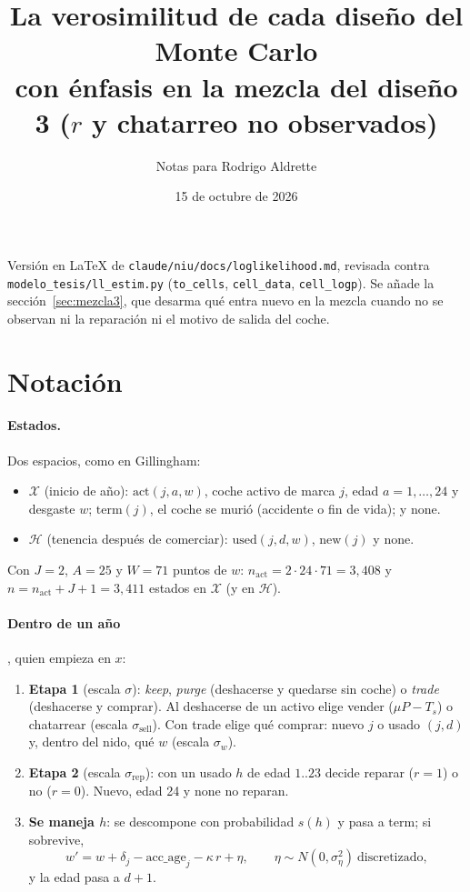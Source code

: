 \documentclass[11pt]{article}
\title{La verosimilitud de cada diseño del Monte Carlo\\[2pt]
\large con énfasis en la mezcla del diseño 3 ($r$ y chatarreo no observados)}
\author{Notas para Rodrigo Aldrette}
\date{15 de octubre de 2026}
\newcommand{\code}[1]{\texttt{\small #1}}
\newcommand{\act}{\mathrm{act}}
\newcommand{\term}{\mathrm{term}}
\newcommand{\none}{\mathrm{none}}
\newcommand{\used}{\mathrm{used}}
\newcommand{\new}{\mathrm{new}}
\newcommand{\1}{\mathbf{1}}
\begin{document}
\maketitle

\noindent Versión en \LaTeX{} de \code{claude/niu/docs/loglikelihood.md}, revisada contra
\code{modelo\_tesis/ll\_estim.py} (\code{to\_cells}, \code{cell\_data}, \code{cell\_logp}).
Se añade la sección~\ref{sec:mezcla3}, que desarma qué entra nuevo en la mezcla cuando no se
observan ni la reparación ni el motivo de salida del coche.

\tableofcontents

\section{Notación}

\paragraph{Estados.} Dos espacios, como en Gillingham:
\begin{itemize}
  \item $\mathcal X$ (inicio de año): $\act(j,a,w)$, coche activo de marca $j$, edad
  $a=1,\dots,24$ y desgaste $w$; $\term(j)$, el coche se murió (accidente o fin de vida);
  y $\none$.
  \item $\mathcal H$ (tenencia después de comerciar): $\used(j,d,w)$, $\new(j)$ y $\none$.
\end{itemize}
Con $J=2$, $A=25$ y $W=71$ puntos de $w$: $n_{\act}=2\cdot 24\cdot 71=3{,}408$ y
$n=n_{\act}+J+1=3{,}411$ estados en $\mathcal X$ (y en $\mathcal H$).

\paragraph{Dentro de un año}, quien empieza en $x$:
\begin{enumerate}
  \item \textbf{Etapa 1} (escala $\sigma$): \emph{keep}, \emph{purge} (deshacerse y quedarse sin
  coche) o \emph{trade} (deshacerse y comprar). Al deshacerse de un activo elige vender
  ($\mu P - T_s$) o chatarrear (escala $\sigma_{\text{sell}}$). Con trade elige qué
  comprar: nuevo $j$ o usado $(j,d)$ y, dentro del nido, qué $w$ (escala $\sigma_w$).
  \item \textbf{Etapa 2} (escala $\sigma_{\text{rep}}$): con un usado $h$ de edad $1..23$
  decide reparar ($r=1$) o no ($r=0$). Nuevo, edad 24 y $\none$ no reparan.
  \item \textbf{Se maneja $h$}: se descompone con probabilidad $s(h)$ y pasa a $\term$; si
  sobrevive,
  \[
    w' = w + \delta_j - \text{acc\_age}_j - \kappa\, r + \eta,\qquad
    \eta\sim N(0,\sigma_\eta^2)\ \text{discretizado},
  \]
  y la edad pasa a $d+1$.
\end{enumerate}
\end{document}

